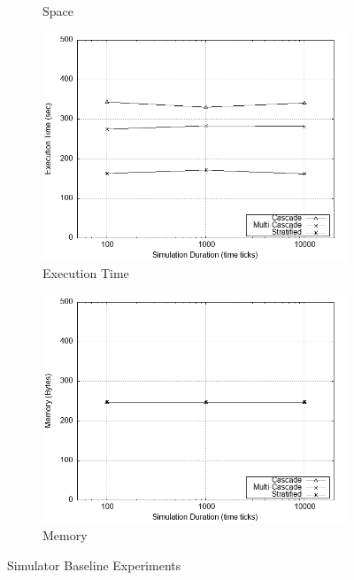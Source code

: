 \documentclass[logo,msc,cyber]{infthesis}   %
\begin{document}
\begin{figure}[h!]
\begin{subfigure}[b]{0.45\textwidth}
        \caption{Space}
        \label{fig:baseline-space}
    \end{subfigure}
    \hfill
    \begin{subfigure}[b]{0.45\textwidth}
        \centering
        \includegraphics[width=\textwidth]{figures/baseline_simulation/simulator/baseline_simulator_time.png}
        \caption{Execution Time}
        \label{fig:baseline-time}
    \end{subfigure}
    \hfill
    \begin{subfigure}[b]{0.45\textwidth}
        \centering
        \includegraphics[width=\textwidth]{figures/baseline_simulation/simulator/baseline_simulator_mem.png}
        \caption{Memory}
        \label{fig:baseline-mem}
    \end{subfigure}
       \caption{Simulator Baseline Experiments}
       \label{fig:baseline-simulation}
 \end{figure}
 
\end{document}
